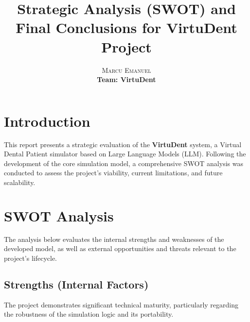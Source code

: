 \documentclass{article}
\title{Strategic Analysis (SWOT) and Final Conclusions for VirtuDent Project}
\author{
  \textsc{Marcu Emanuel}\\[0.4em]
  \normalsize\textbf{Team: VirtuDent}
}
\date{}
\begin{document}
\maketitle

\section{Introduction}
This report presents a strategic evaluation of the \textbf{VirtuDent} system, a Virtual Dental Patient simulator based on Large Language Models (LLM). Following the development of the core simulation model, a comprehensive SWOT analysis was conducted to assess the project's viability, current limitations, and future scalability.

\section{SWOT Analysis}

The analysis below evaluates the internal strengths and weaknesses of the developed model, as well as external opportunities and threats relevant to the project's lifecycle.

\subsection{Strengths (Internal Factors)}
The project demonstrates significant technical maturity, particularly regarding the robustness of the simulation logic and its portability.
\end{document}

